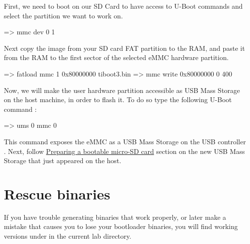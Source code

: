 First, we need to boot on our SD Card to have access to U-Boot commands and
select the  partition we want to work on.

\begin{ubootinput}
  => mmc dev 0 1
\end{ubootinput}

Next copy the  image from your SD card FAT partition to the RAM,
and paste it from the RAM to the first sector of the selected eMMC hardware
partition.

\begin{ubootinput}
  => fatload mmc 1 0x80000000 tiboot3.bin
  => mmc write 0x80000000 0 400
\end{ubootinput}

Now, we will make the user hardware partition accessible as USB Mass Storage
on the host machine, in order to flash it. To do so type the following
 U-Boot command :
\begin{ubootinput}
  => ums 0 mmc 0
\end{ubootinput}
This command exposes the eMMC  as a USB Mass Storage on the USB
controller .
Next, follow \hyperref[sec:Prepboot]{Preparing a bootable micro-SD card} section
on the new USB Mass Storage that just appeared on the host.

\section{Rescue binaries}

If you have trouble generating binaries that work properly, or later
make a mistake that causes you to lose your bootloader binaries, you
will find working versions under  in the current lab
directory.
